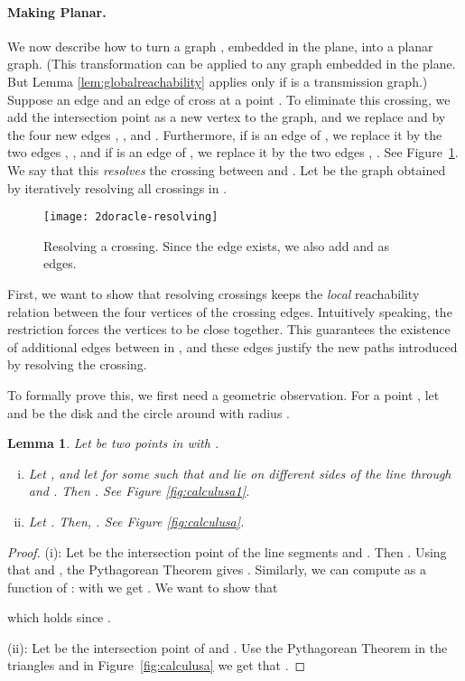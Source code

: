 \documentclass[11pt,a4paper]{paper}
\newtheorem{lemma}[theorem]{Lemma}
\begin{document}
\paragraph*{Making  Planar.}
We now describe how to turn a graph , embedded in the plane, into a planar graph. (This transformation can be applied to
any graph embedded in the plane. But Lemma \ref{lem:globalreachability} applies only if  is a transmission graph.)
Suppose an edge 
and an edge  of 
cross at a point .
To eliminate this crossing, we add the intersection 
point  as a new vertex to the graph, and we replace
 and  by the four new
edges , , 
and .
Furthermore, if  is an edge of , we replace it by
the two edges , ,
and if  is an edge of , we replace it by
the two edges , . See Figure~\ref{fig:resolving}.
We say that this \emph{resolves} the crossing between  and .
Let  be the graph obtained by iteratively resolving all
crossings in .
\begin{figure}[htb]
\centering
\texttt{[image: 2doracle-resolving]}
\caption{Resolving a crossing. Since the edge  exists, we also add  and
 as edges.}
\label{fig:resolving}
\end{figure}

First, we want to show that resolving crossings keeps the \emph{local}
reachability relation between the four vertices of the crossing edges.
Intuitively speaking, the  restriction 
forces the vertices to be close together. This guarantees the existence of
additional edges between  in , and these edges
justify the new paths introduced by resolving the crossing.

To formally prove this, we first need a geometric observation.
For a point ,
let  and  be the disk and the circle around
 with radius .

\begin{lemma}
\label{lem:calculus}
Let  be two points in  with .
\begin{enumerate}[(i)]
\item Let , and let   for
some  such that
 and  lie on different
 sides of the line through  and .  Then . See Figure \ref{fig:calculusa1}.
\item Let
. Then, . See Figure \ref{fig:calculusa}.
\end{enumerate}
\end{lemma}

\begin{proof}
(i): Let   be the intersection point
of the line segments  and .
Then .
Using that  and , the Pythagorean Theorem
gives . Similarly, we can compute  as a function of :
 with  we get .
We want to show that

which holds since .

(ii): Let   be the intersection point
of  and .
Use the Pythagorean Theorem in the triangles  and  in  Figure~\ref{fig:calculusa}
we get that .
\end{proof}
\end{document}

